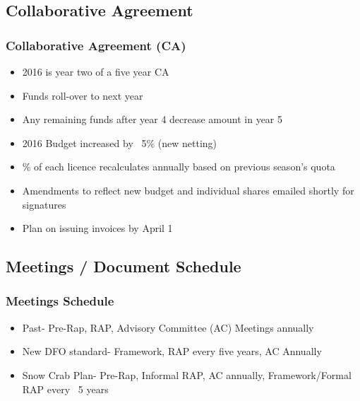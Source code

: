 \subsection{Collaborative Agreement}

\begin{frame}

\frametitle{Collaborative Agreement (CA)}

 \vspace*{-0.5cm}
\begin{block}

\begin{itemize}
\item 2016 is year two of a five year CA
\item Funds roll-over to next year
\item Any remaining funds after year 4 decrease amount in year 5
\item 2016 Budget increased by ~5\% (new netting)
\item \% of each licence recalculates annually based on previous season's quota
\item Amendments to reflect new budget and individual shares emailed shortly for signatures
\item Plan on issuing invoices by April 1



\end{itemize}



\end{block}


\end{frame}



\subsection{Meetings / Document Schedule}

\begin{frame}

\frametitle{Meetings Schedule}

 \vspace*{-0.5cm}
\begin{block}

\begin{itemize}
\item Past- Pre-Rap, RAP, Advisory Committee (AC) Meetings annually
\item New DFO standard- Framework, RAP every five years, AC Annually
\item Snow Crab Plan- Pre-Rap, Informal RAP, AC annually, Framework/Formal RAP every ~5 years

\end{itemize}


\end{block}


\end{frame}

